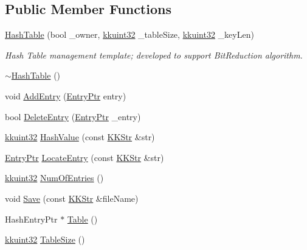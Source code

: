 \subsection*{Public Member Functions}
\begin{DoxyCompactItemize}
\item 
\hyperlink{class_k_k_b_1_1_hash_table_a063bc26af1e8f29ab332608790be290f}{Hash\+Table} (bool \+\_\+owner, \hyperlink{namespace_k_k_b_af8d832f05c54994a1cce25bd5743e19a}{kkuint32} \+\_\+table\+Size, \hyperlink{namespace_k_k_b_af8d832f05c54994a1cce25bd5743e19a}{kkuint32} \+\_\+key\+Len)
\begin{DoxyCompactList}\small\item\em Hash Table management template; developed to support Bit\+Reduction algorithm. \end{DoxyCompactList}\item 
\hyperlink{class_k_k_b_1_1_hash_table_a318e7a9196a979e70f21bd8cce905b97}{$\sim$\+Hash\+Table} ()
\item 
void \hyperlink{class_k_k_b_1_1_hash_table_a8bba92cda5bf998c35e2c1c710c71f6e}{Add\+Entry} (\hyperlink{class_k_k_b_1_1_hash_table_ac2ea7aefb6917165187d622e5dad2563}{Entry\+Ptr} entry)
\item 
bool \hyperlink{class_k_k_b_1_1_hash_table_ae1b0066c724a27259e8ce5b7aad96fce}{Delete\+Entry} (\hyperlink{class_k_k_b_1_1_hash_table_ac2ea7aefb6917165187d622e5dad2563}{Entry\+Ptr} \+\_\+entry)
\item 
\hyperlink{namespace_k_k_b_af8d832f05c54994a1cce25bd5743e19a}{kkuint32} \hyperlink{class_k_k_b_1_1_hash_table_af52b312fc23d6f07325b67ceed97b1e7}{Hash\+Value} (const \hyperlink{class_k_k_b_1_1_k_k_str}{K\+K\+Str} \&str)
\item 
\hyperlink{class_k_k_b_1_1_hash_table_ac2ea7aefb6917165187d622e5dad2563}{Entry\+Ptr} \hyperlink{class_k_k_b_1_1_hash_table_a9ba1d3083dafe9906a57ac4da33c96cf}{Locate\+Entry} (const \hyperlink{class_k_k_b_1_1_k_k_str}{K\+K\+Str} \&str)
\item 
\hyperlink{namespace_k_k_b_af8d832f05c54994a1cce25bd5743e19a}{kkuint32} \hyperlink{class_k_k_b_1_1_hash_table_a64dbc46abb0aa4fb82b718fffa18dc6f}{Num\+Of\+Entries} ()
\item 
void \hyperlink{class_k_k_b_1_1_hash_table_a3a9207f5b1acd3f883f6172e65ac08f3}{Save} (const \hyperlink{class_k_k_b_1_1_k_k_str}{K\+K\+Str} \&file\+Name)
\item 
Hash\+Entry\+Ptr $\ast$ \hyperlink{class_k_k_b_1_1_hash_table_a26ef60c66fba994c2132a2f37f729bd1}{Table} ()
\item 
\hyperlink{namespace_k_k_b_af8d832f05c54994a1cce25bd5743e19a}{kkuint32} \hyperlink{class_k_k_b_1_1_hash_table_a538c9eb3a23ade30699bb13aadc748b7}{Table\+Size} ()
\end{DoxyCompactItemize}


